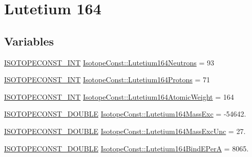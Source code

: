 \hypertarget{group___isotope_const-_lutetium-_lu164}{}\section{Lutetium 164}
\label{group___isotope_const-_lutetium-_lu164}
\subsection*{Variables}
\begin{DoxyCompactItemize}
\item 
\mbox{\hyperlink{group___isotope_const-_macros_ga5f18360b3e99483a35c32d789e62621c}{I\+S\+O\+T\+O\+P\+E\+C\+O\+N\+S\+T\+\_\+\+I\+NT}} \mbox{\hyperlink{group___isotope_const-_lutetium-_lu164_gac60d9b3aefe05dd11f36bd40bc381475}{Isotope\+Const\+::\+Lutetium164\+Neutrons}} = 93
\item 
\mbox{\hyperlink{group___isotope_const-_macros_ga5f18360b3e99483a35c32d789e62621c}{I\+S\+O\+T\+O\+P\+E\+C\+O\+N\+S\+T\+\_\+\+I\+NT}} \mbox{\hyperlink{group___isotope_const-_lutetium-_lu164_ga051951f4948d03b1e16452f3893f8ca0}{Isotope\+Const\+::\+Lutetium164\+Protons}} = 71
\item 
\mbox{\hyperlink{group___isotope_const-_macros_ga5f18360b3e99483a35c32d789e62621c}{I\+S\+O\+T\+O\+P\+E\+C\+O\+N\+S\+T\+\_\+\+I\+NT}} \mbox{\hyperlink{group___isotope_const-_lutetium-_lu164_gaec52c6173f8f531bbb32df04dd45076b}{Isotope\+Const\+::\+Lutetium164\+Atomic\+Weight}} = 164
\item 
\mbox{\hyperlink{group___isotope_const-_macros_ga8f45a7272ce02c0b4c65c44636ed719a}{I\+S\+O\+T\+O\+P\+E\+C\+O\+N\+S\+T\+\_\+\+D\+O\+U\+B\+LE}} \mbox{\hyperlink{group___isotope_const-_lutetium-_lu164_ga44b022730b248bfde9ffa5bd10b80fdc}{Isotope\+Const\+::\+Lutetium164\+Mass\+Exc}} = -\/54642.
\item 
\mbox{\hyperlink{group___isotope_const-_macros_ga8f45a7272ce02c0b4c65c44636ed719a}{I\+S\+O\+T\+O\+P\+E\+C\+O\+N\+S\+T\+\_\+\+D\+O\+U\+B\+LE}} \mbox{\hyperlink{group___isotope_const-_lutetium-_lu164_ga2970cdd7d795a7d72ed592e413b61688}{Isotope\+Const\+::\+Lutetium164\+Mass\+Exc\+Unc}} = 27.
\item 
\mbox{\hyperlink{group___isotope_const-_macros_ga8f45a7272ce02c0b4c65c44636ed719a}{I\+S\+O\+T\+O\+P\+E\+C\+O\+N\+S\+T\+\_\+\+D\+O\+U\+B\+LE}} \mbox{\hyperlink{group___isotope_const-_lutetium-_lu164_ga767bcca9c5a884b0cb5b923a5b4c0c11}{Isotope\+Const\+::\+Lutetium164\+Bind\+E\+PerA}} = 8065.
\item 

\end{DoxyCompactItemize}
